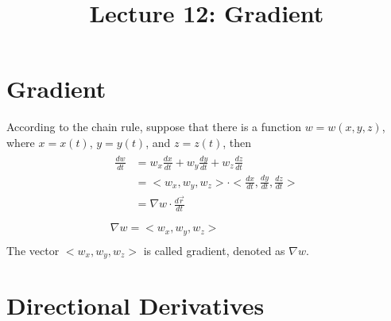 \documentclass{article}
\title{Lecture 12: Gradient}
\author{}
\date{}
\begin{document}
    
\maketitle

\section{Gradient}

According to the chain rule, suppose that there is a function $w = w(x, y, z)$, 
where $x = x(t)$, $y = y(t)$, and $z = z(t)$, then
\begin{gather*}
  \begin{split}
    \frac{dw}{dt} &= w_x \frac{dx}{dt} + w_y \frac{dy}{dt} + w_z \frac{dz}{dt} \\
                  &= <w_x, w_y, w_z> \cdot <\frac{dx}{dt}, \frac{dy}{dt}, \frac{dz}{dt}> \\
                  &= \nabla w \cdot \frac{d\vec{r}}{dt} \\
  \end{split} \\
  \nabla w = <w_x, w_y, w_z> \\
\end{gather*}
The vector $<w_x, w_y, w_z>$ is called gradient, denoted as $\nabla w$.

\section{Directional Derivatives}
\end{document}
